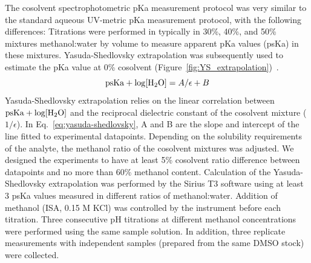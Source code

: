 \documentclass[9pt,lineno]{elife}
\begin{document}
The cosolvent spectrophotometric pKa measurement protocol was very similar to the standard aqueous UV-metric pKa measurement protocol, with the following differences: 
Titrations were performed in typically in 30\%, 40\%, and 50\% mixtures methanol:water by volume to measure apparent pKa values (psKa) in these mixtures. 
Yasuda-Shedlovsky extrapolation was subsequently used to estimate the pKa value at 0\% cosolvent (Figure~\ref{fig:YS_extrapolation})~\citep{avdeef_ph-metric_1999,doi:10.1021/ac00049a010,TAKACSNOVAK1997235}. 
\begin{equation}
\mathrm{psKa} + \log [\ce{H2O}]=A/\epsilon+B 
\label{eq:yasuda-shedlovsky}
\end{equation}
Yasuda-Shedlovsky extrapolation relies on the linear correlation between $\mathrm{psKa} + \log [\ce{H2O}]$ and the reciprocal dielectric constant of the cosolvent mixture ($1/\epsilon$). 
In Eq.~\ref{eq:yasuda-shedlovsky}, A and B are the slope and intercept of the line fitted to experimental datapoints.  
Depending on the solubility requirements of the analyte, the methanol ratio of the cosolvent mixtures was adjusted. 
We designed the experiments to have at least 5\% cosolvent ratio difference between datapoints and no more than 60\% methanol content. 
Calculation of the Yasuda-Shedlovsky extrapolation was performed by the Sirius T3 software using at least 3 psKa values measured in different ratios of methanol:water.
Addition of methanol (ISA, 0.15 M KCl) was controlled by the instrument before each titration. 
Three consecutive pH titrations at different methanol concentrations were performed using the same sample solution. 
In addition, three replicate measurements with independent samples (prepared from the same DMSO stock) were collected.
\end{document}
